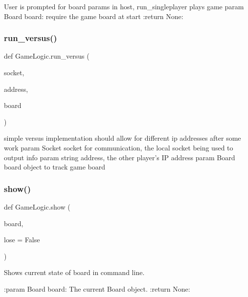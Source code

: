 \begin{DoxyVerb}User is prompted for board params in host,
run_singleplayer plays game
param Board board: require the game board at start
:return None:
\end{DoxyVerb}
 \mbox{\label{namespace_game_logic_ae210e41405e4a019624993e6eec6b99a}} 
\subsubsection{\texorpdfstring{run\+\_\+versus()}{run\_versus()}}
{\footnotesize\ttfamily def Game\+Logic.\+run\+\_\+versus (\begin{DoxyParamCaption}\item[{}]{socket,  }\item[{}]{address,  }\item[{}]{board }\end{DoxyParamCaption})}

\begin{DoxyVerb}simple versus implementation
should allow for different ip addresses after some work
param Socket socket for communication, the local socket being used to
    output info
param string address, the other player's IP address
param Board board object to track game board
\end{DoxyVerb}
 \mbox{\label{namespace_game_logic_afacbe6e69e6b939244d8c5f0aba5ff34}} 
\subsubsection{\texorpdfstring{show()}{show()}}
{\footnotesize\ttfamily def Game\+Logic.\+show (\begin{DoxyParamCaption}\item[{}]{board,  }\item[{}]{lose = {\ttfamily False} }\end{DoxyParamCaption})}

\begin{DoxyVerb}Shows current state of board in command line.

:param Board board: The current Board object.
:return None:
\end{DoxyVerb}
 \mbox{\label{namespace_game_logic_ae766be9cec703745c4f97f4f85a79dfc}} 
